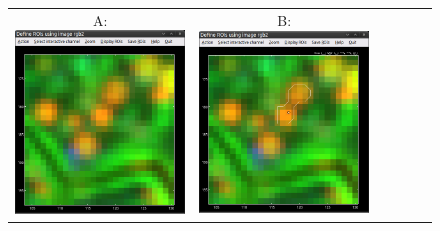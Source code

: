 \begin{figure}[!b]
\centering
\begin{tabular}{cccccc}
A: \includegraphics[scale=0.23]{figs3/LANS-roi-interactive0}
&
B: \includegraphics[scale=0.23]{figs3/LANS-roi-interactive1}

\end{tabular}
\end{figure}
